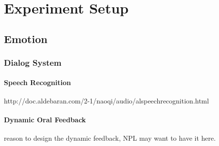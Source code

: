 \chapter{Experiment Setup}

\section{Emotion}
\subsection{Dialog System}

\subsubsection{Speech Recognition}
http://doc.aldebaran.com/2-1/naoqi/audio/alspeechrecognition.html

\subsubsection{Dynamic Oral Feedback}
reason to design the dynamic feedback, NPL may want to have it here. 

\